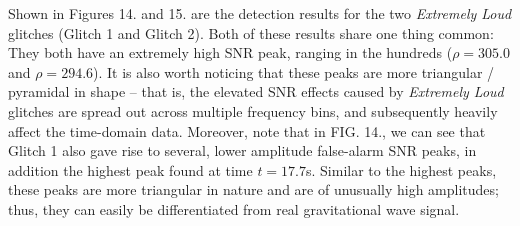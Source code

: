 \documentclass[preprint,
letterpaper,
 amsmath,amssymb,
 aps,
]{revtex4-2}
\begin{document}
Shown in Figures 14. and 15. are the detection results for the two \textit{Extremely Loud} glitches (Glitch 1 and Glitch 2). Both of these results share one thing common: They both have an extremely high SNR peak, ranging in the hundreds ($\rho=305.0$ and $\rho=294.6$). It is also worth noticing that these peaks are more triangular / pyramidal in shape – that is, the elevated SNR effects caused by \textit{Extremely Loud} glitches are spread out across multiple frequency bins, and subsequently heavily affect the time-domain data. Moreover, note that in FIG. 14., we can see that Glitch 1 also gave rise to several, lower amplitude false-alarm SNR peaks, in addition the highest peak found at time $t=17.7$s. Similar to the highest peaks, these peaks are more triangular in nature and are of unusually high amplitudes; thus, they can easily be differentiated from real gravitational wave signal.
\end{document}
